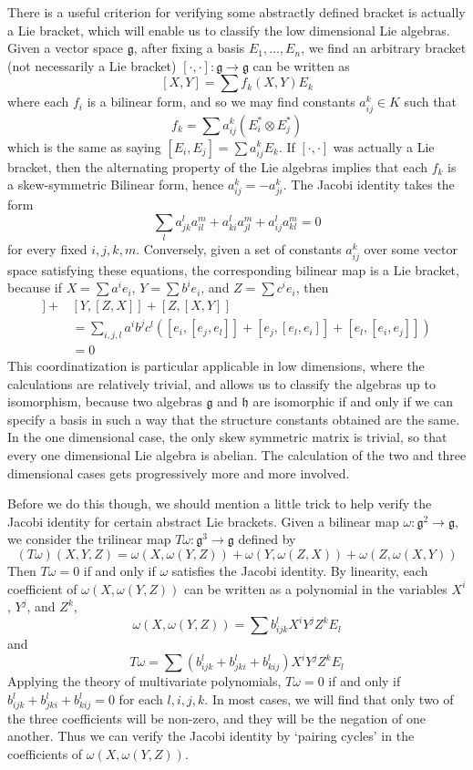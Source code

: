 There is a useful criterion for verifying some abstractly defined bracket is actually a Lie bracket, which will enable us to classify the low dimensional Lie algebras. Given a vector space $\mathfrak{g}$, after fixing a basis $E_1, \dots, E_n$, we find an arbitrary bracket (not necessarily a Lie bracket) $[\cdot, \cdot]: \mathfrak{g} \to \mathfrak{g}$ can be written as
%
\[ [X,Y] = \sum f_k(X,Y) E_k \]
%
where each $f_i$ is a bilinear form, and so we may find constants $a_{ij}^k \in K$ such that
%
\[ f_k = \sum a^k_{ij} ( E_i^* \otimes E_j^* ) \]
%
which is the same as saying $[E_i, E_j] = \sum a_{ij}^k E_k$. If $[\cdot, \cdot]$ was actually a Lie bracket, then the alternating property of the Lie algebras implies that each $f_k$ is a skew-symmetric Bilinear form, hence $a_{ij}^k = -a_{ji}^k$. The Jacobi identity takes the form
%
\[ \sum_l a_{jk}^l a_{il}^m + a_{ki}^l a_{jl}^m + a_{ij}^l a_{kl}^m = 0 \]
%
for every fixed $i,j,k,m$. Conversely, given a set of constants $a^k_{ij}$ over some vector space satisfying these equations, the corresponding bilinear map is a Lie bracket, because if $X = \sum a^i e_i$, $Y = \sum b^i e_i$, and $Z = \sum c^i e_i$, then
%
\begin{align*}
    [X,[Y,Z]] + &[Y,[Z,X]] + [Z,[X,Y]]\\
    &= \sum_{i,j,l} a^i b^j c^l \left( [e_i,[e_j,e_l]] + [e_j,[e_l,e_i]] + [e_l,[e_i,e_j]] \right)\\
    &= 0
\end{align*}
%
This coordinatization is particular applicable in low dimensions, where the calculations are relatively trivial, and allows us to classify the algebras up to isomorphism, because two algebras $\mathfrak{g}$ and $\mathfrak{h}$ are isomorphic if and only if we can specify a basis in such a way that the structure constants obtained are the same. In the one dimensional case, the only skew symmetric matrix is trivial, so that every one dimensional Lie algebra is abelian. The calculation of the two and three dimensional cases gets progressively more and more involved.

Before we do this though, we should mention a little trick to help verify the Jacobi identity for certain abstract Lie brackets. Given a bilinear map $\omega: \mathfrak{g}^2 \to \mathfrak{g}$, we consider the trilinear map $T\omega: \mathfrak{g}^3 \to \mathfrak{g}$ defined by
%
\[ (T \omega)(X,Y,Z) = \omega(X, \omega(Y,Z)) + \omega(Y,\omega(Z,X)) + \omega(Z,\omega(X,Y)) \]
%
Then $T \omega = 0$ if and only if $\omega$ satisfies the Jacobi identity. By linearity, each coefficient of $\omega(X,\omega(Y,Z))$ can be written as a polynomial in the variables $X^i$, $Y^j$, and $Z^k$,
%
\[ \omega(X, \omega(Y,Z)) = \sum b_{ijk}^l X^i Y^j Z^k E_l \]
%
and
%
\[ T\omega = \sum (b_{ijk}^l + b_{jki}^l + b_{kij}^l) X^i Y^j Z^k E_l \]
%
Applying the theory of multivariate polynomials, $T \omega = 0$ if and only if $b_{ijk}^l + b_{jki}^l + b_{kij}^l = 0$ for each $l, i, j, k$. In most cases, we will find that only two of the three coefficients will be non-zero, and they will be the negation of one another. Thus we can verify the Jacobi identity by `pairing cycles' in the coefficients of $\omega(X,\omega(Y,Z))$.

